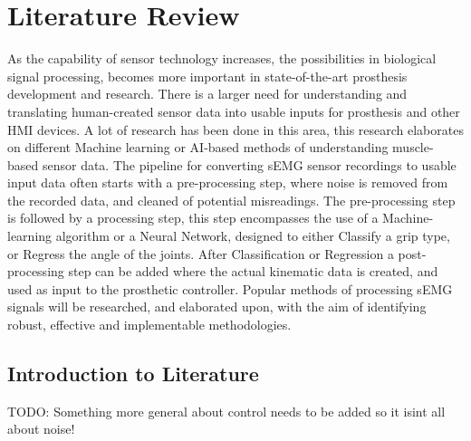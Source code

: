 \documentclass[../main.tex]{subfiles}
\begin{document}
\section{Literature Review}
\label{sec:literature}

As the capability of sensor technology increases, the possibilities in biological signal processing, becomes more important in state-of-the-art prosthesis development and research.
There is a larger need for understanding and translating human-created sensor data into usable inputs for prosthesis and other \gls{HMI} devices.
A lot of research has been done in this area, this research elaborates on different Machine learning or AI-based methods of understanding muscle-based sensor data.
The pipeline for converting sEMG sensor recordings to usable input data often starts with a pre-processing step, where noise is removed from the recorded data, and cleaned of potential misreadings.
The pre-processing step is followed by a processing step, this step encompasses the use of a Machine-learning algorithm or a Neural Network, designed to either Classify a grip type, or Regress the angle of the joints.
After Classification or Regression a post-processing step can be added where the actual kinematic data is created, and used as input to the prosthetic controller. 
Popular methods of processing sEMG signals will be researched, and elaborated upon, with the aim of identifying robust, effective and implementable methodologies.


\subsection{Introduction to Literature}
TODO: Something more general about control needs to be added so it isint all about noise!
\end{document}
